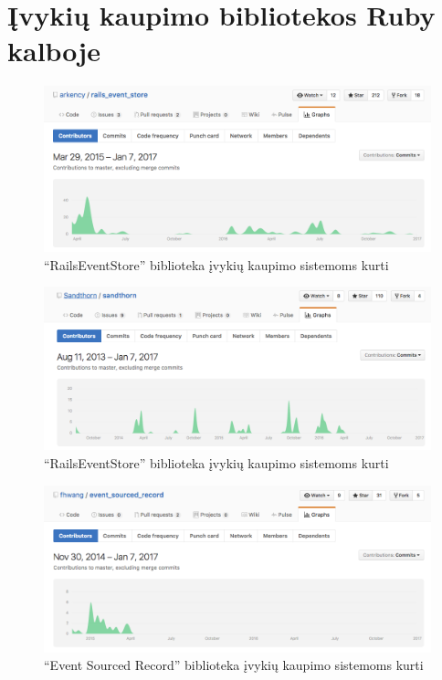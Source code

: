 \documentclass{VUMIFPSmagistrinis}
\begin{document}
\section{Įvykių kaupimo bibliotekos Ruby kalboje}

\begin{figure}[H]
    \centering
    \includegraphics[scale=0.35]{img/rails_event_store}
    \caption{``RailsEventStore'' biblioteka įvykių kaupimo sistemoms kurti}
    \label{img:rails_event_store}
\end{figure}

\begin{figure}[H]
    \centering
    \includegraphics[scale=0.35]{img/sandthorn}
    \caption{``RailsEventStore'' biblioteka įvykių kaupimo sistemoms kurti}
    \label{img:sandthorn}
\end{figure}

\begin{figure}[H]
    \centering
    \includegraphics[scale=0.35]{img/event_sourced_record}
    \caption{``Event Sourced Record'' biblioteka įvykių kaupimo sistemoms kurti}
    \label{img:event_sourced_record}
\end{figure}
\end{document}
